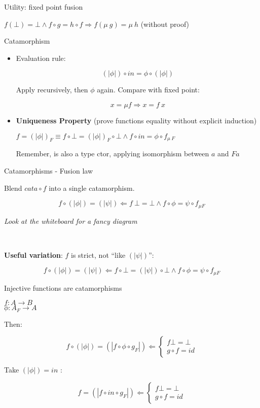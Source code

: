 \documentclass{beamer}
\begin{document}
\begin{frame}{Utility: fixed point fusion}

$f ( \bot ) = \bot \land f \circ g = h \circ f \Rightarrow f (\mu \ g) = \mu \ h $ (without proof)

\end{frame}

\begin{frame}[fragile]{Catamorphism}
\begin{itemize}
\item Evaluation rule:

$$(\!| \phi |\!)\circ in = \phi \circ (\!| \phi |\!)$$

Apply recursively, then $\phi$ again. Compare with fixed point:

$$x = \mu f \Rightarrow x = f \ x$$

\item \textbf{Uniqueness Property} (prove functions equality without explicit induction)

$f = (\!| \phi |\!)_F \equiv  f \circ \bot = ( \!| \phi |\!)_F \circ \bot \land f \circ in = \phi \circ f_{\mu\ F}$

Remember,  is also a type ctor, applying isomorphism between $a$ and $F a$
\end{itemize}

\end{frame}


\begin{frame}{Catamorphisms - Fusion law}

Blend $cata\circ f$ into a single catamorphism.

$$f \circ (\!|\phi|\!) =  (\!|\psi|\!)  \Leftarrow f \ \bot = \bot \land f \circ \phi = \psi \circ f_{\mu F}$$

\textit{Look at the whiteboard for a fancy diagram}

~

\textbf{Useful variation}: $f$ is strict, not ``like $(\!|\psi|\!)$'':

$$f \circ (\!|\phi|\!) =  (\!|\psi|\!)  \Leftarrow f \circ \bot = (\!|\psi|\!)  \circ \bot \land f \circ \phi = \psi \circ f_{\mu F}$$

\end{frame}

\begin{frame}{Injective functions are catamorphisms}

$f: A \rightarrow B$\\
$\phi: A_F \rightarrow A$

Then:

$$f \circ (\!|\phi|\!) = (\!|f \circ \phi \circ g_F |\!) \Leftarrow \begin{cases} f \bot = \bot \\ g \circ f = id\end{cases}$$

Take $(\!|\phi|\!) = in$ :

$$f = (\!|f \circ in \circ g_F |\!) \Leftarrow \begin{cases} f \bot = \bot \\ g \circ f = id\end{cases}$$
\end{frame}
\end{document}
